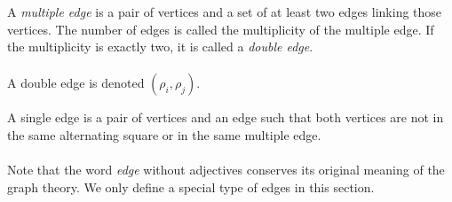 \begin{definition}

  A \textit{multiple edge} is a pair of vertices and a set of at least two edges linking those vertices. The number of edges is called the multiplicity of the multiple edge. If the multiplicity is exactly two, it is called a \textit{double edge}.

  \begin{figure}[H]
    \begin{center}
      \caption{}
    \end{center}
  \end{figure}

  \paragraph{}
  A double edge is denoted $(\rho_i, \rho_j)$.
\end{definition}

\begin{definition}
  \label{single-edge}
  A single edge is a pair of vertices and an edge such that both vertices are not in the same alternating square or in the same multiple edge.
\end{definition}

\paragraph{}
Note that the word \textit{edge} without adjectives conserves its original meaning of the graph theory. We only define a special type of edges in this section.

